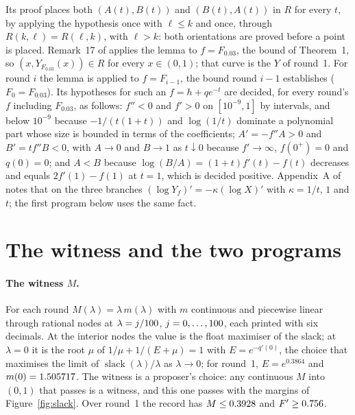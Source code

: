 \documentclass[11pt]{article}
\newcommand{\slack}{\operatorname{slack}}
\begin{document}
Its proof places both $(A(t),B(t))$ and $(B(t),A(t))$ in $R$ for every $t$, by applying the hypothesis once with $\ell\le k$ and once, through $R(k,\ell)=R(\ell,k)$, with $\ell>k$: both orientations are proved before a point is placed. Remark~17 of \cite{GNNW} applies the lemma to $f=F_{0.03}$, the bound of Theorem~1, so $(x,Y_{F_{0.03}}(x))\in R$ for every $x\in(0,1)$; that curve is the $Y$ of round~1. For round $i$ the lemma is applied to $f=F_{i-1}$, the bound round $i-1$ establishes ($F_0=F_{0.03}$). Its hypotheses for such an $f=h+qe^{-t}$ are decided, for every round's $f$ including $F_{0.03}$, as follows: $f''<0$ and $f'>0$ on $[10^{-9},1]$ by intervals, and below $10^{-9}$ because $-1/(t(1+t))$ and $\log(1/t)$ dominate a polynomial part whose size is bounded in terms of the coefficients; $A'=-f''A>0$ and $B'=tf''B<0$, with $A\to0$ and $B\to1$ as $t\downarrow0$ because $f'\to\infty$, $f(0^+)=0$ and $q(0)=0$; and $A<B$ because $\log(B/A)=(1+t)f'(t)-f(t)$ decreases and equals $2f'(1)-f(1)$ at $t=1$, which is decided positive. Appendix~A of \cite{GNNW} notes that on the three branches $(\log Y_f)'=-\kappa(\log X)'$ with $\kappa=1/t$, $1$ and $t$; the first program below uses the same fact.

\section{The witness and the two programs}\label{sec:witness}

\paragraph{The witness $M$.} For each round $M(\lambda)=\lambda\,m(\lambda)$ with $m$ continuous and piecewise linear through \MNodes{} rational nodes at $\lambda=j/100$, $j=0,\dots,100$, each printed with six decimals. At the interior nodes the value is the float maximiser of the slack; at $\lambda=0$ it is the root $\mu$ of $1/\mu+1/(E+\mu)=1$ with $E=e^{-q'(0)}$, the choice that maximises the limit of $\slack(\lambda)/\lambda$ as $\lambda\to0$; for round~1, $E=e^{0.3864}$ and $m(0)=1.505717$. The witness is a proposer's choice: any continuous $M$ into $(0,1)$ that passes is a witness, and this one passes with the margins of Figure~\ref{fig:slack}. Over round~1 the record has $M\le0.3928$ and $F'\ge0.756$.
\end{document}
